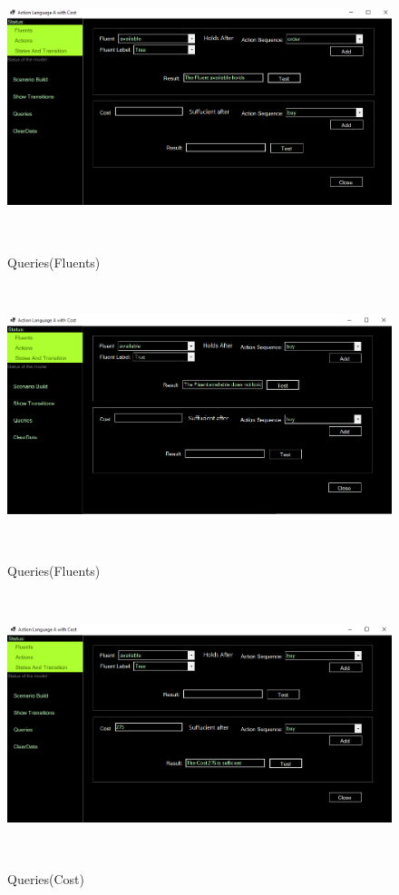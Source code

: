 \documentclass[11pt]{article}
\begin{document}
		\begin{figure}[H]
		\centering
		\includegraphics[width=6in,height=3in]{./testImages/Example2/img7.png}
		\label{Figure:f02.7}
		\caption{Queries(Fluents)}
	\end{figure}
	\begin{figure}[H]
		\centering
		\includegraphics[width=6in,height=3in]{./testImages/Example2/img8.png}
		\label{Figure:f02.8}
		\caption{Queries(Fluents)}
	\end{figure}
	\begin{figure}[H]
		\centering
		\includegraphics[width=6in,height=3in]{./testImages/Example2/img9.png}
		\label{Figure:f02.9}
		\caption{Queries(Cost)}
	\end{figure}
\end{document}
